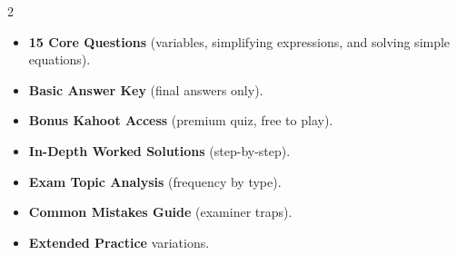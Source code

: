 \documentclass[11pt,a4paper]{article}
\newcommand{\FullReleaseDate}{April 30, 2026}
\begin{document}
\vspace{8pt}

\begin{multicols}{2}
  \begin{tcolorbox}[card, title=\sffamily\bfseries\textcolor{white}{\faHandPointDown\ TODAY (Simplified Version)}, colbacktitle=mainblue, boxed title style={sharp corners, boxrule=0pt}]
    \begin{itemize}[leftmargin=1.2em, itemsep=2pt]
      \item \small \textbf{15 Core Questions} (variables, simplifying expressions, and solving simple equations).
      \item \small \textbf{Basic Answer Key} (final answers only).
      \item \small \textbf{Bonus Kahoot Access} (premium quiz, free to play).
    \end{itemize}
  \end{tcolorbox}

  \columnbreak

  \begin{tcolorbox}[card, title=\sffamily\bfseries\textcolor{white}{\faRocket\ ON \FullReleaseDate\ (Full Upgrade)}, colbacktitle=mainblue, boxed title style={sharp corners, boxrule=0pt}]
    \begin{itemize}[leftmargin=1.2em, itemsep=2pt]
      \item \small \textbf{In-Depth Worked Solutions} (step-by-step).
      \item \small \textbf{Exam Topic Analysis} (frequency by type).
      \item \small \textbf{Common Mistakes Guide} (examiner traps).
      \item \small \textbf{Extended Practice} variations.
    \end{itemize}
  \end{tcolorbox}
\end{multicols}
\end{document}
